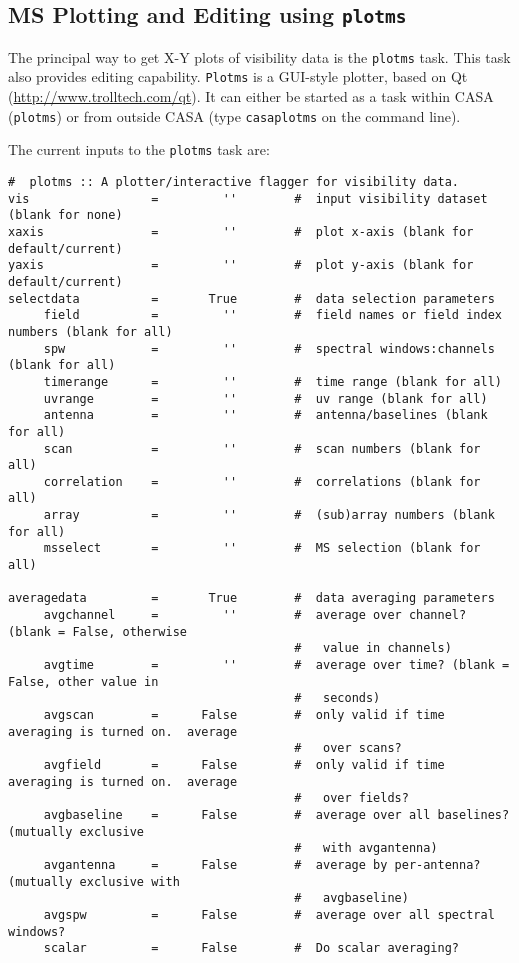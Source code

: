 \subsection{MS Plotting and Editing using {\tt plotms}}
\label{section:edit.plot.plotms}

The principal way to get X-Y plots of visibility data is the {\tt plotms} task. This task also provides editing capability. {\tt Plotms} is a GUI-style plotter, based on Qt (\url{http://www.trolltech.com/qt}). It can either be started as a task within CASA ({\tt plotms}) or from outside CASA (type {\tt casaplotms} on the command line).

The current inputs to the {\tt plotms} task are:
\small
\begin{verbatim}
#  plotms :: A plotter/interactive flagger for visibility data.
vis                 =         ''        #  input visibility dataset (blank for none)
xaxis               =         ''        #  plot x-axis (blank for default/current)
yaxis               =         ''        #  plot y-axis (blank for default/current)
selectdata          =       True        #  data selection parameters
     field          =         ''        #  field names or field index numbers (blank for all)
     spw            =         ''        #  spectral windows:channels (blank for all)
     timerange      =         ''        #  time range (blank for all)
     uvrange        =         ''        #  uv range (blank for all)
     antenna        =         ''        #  antenna/baselines (blank for all)
     scan           =         ''        #  scan numbers (blank for all)
     correlation    =         ''        #  correlations (blank for all)
     array          =         ''        #  (sub)array numbers (blank for all)
     msselect       =         ''        #  MS selection (blank for all)

averagedata         =       True        #  data averaging parameters
     avgchannel     =         ''        #  average over channel?  (blank = False, otherwise
                                        #   value in channels)
     avgtime        =         ''        #  average over time? (blank = False, other value in
                                        #   seconds)
     avgscan        =      False        #  only valid if time averaging is turned on.  average
                                        #   over scans?
     avgfield       =      False        #  only valid if time averaging is turned on.  average
                                        #   over fields?
     avgbaseline    =      False        #  average over all baselines?  (mutually exclusive
                                        #   with avgantenna)
     avgantenna     =      False        #  average by per-antenna?  (mutually exclusive with
                                        #   avgbaseline)
     avgspw         =      False        #  average over all spectral windows?
     scalar         =      False        #  Do scalar averaging?


\end{verbatim}
